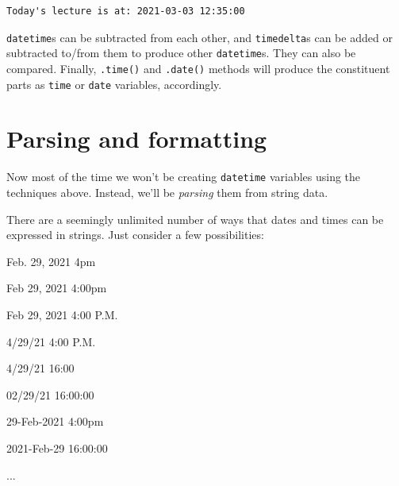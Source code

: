 \begin{itemize}
\begin{Verbatim}[fontsize=\small,samepage=true,frame=leftline,framesep=5mm,framerule=1mm]
Today's lecture is at: 2021-03-03 12:35:00
\end{Verbatim}


\texttt{datetime}s can be subtracted from each other, and \texttt{timedelta}s
can be added or subtracted to/from them to produce other \texttt{datetime}s.
They can also be compared. Finally, \texttt{.time()} and \texttt{.date()}
methods will produce the constituent parts as \texttt{time} or \texttt{date}
variables, accordingly.

%

\end{itemize}


\section{Parsing and formatting}

Now most of the time we won't be creating \texttt{datetime} variables using the
techniques above. Instead, we'll be \textit{parsing} them from string data.

There are a seemingly unlimited number of ways that dates and times can be
expressed in strings. Just consider a few possibilities:

\begin{compactitem}
\item Feb. 29, 2021 4pm
\item Feb 29, 2021 4:00pm
\item Feb 29, 2021 4:00 P.M.
\item 4/29/21 4:00 P.M.
\item 4/29/21 16:00
\item 02/29/21 16:00:00
\item 29-Feb-2021 4:00pm
\item 2021-Feb-29 16:00:00
\item ...
\end{compactitem}

